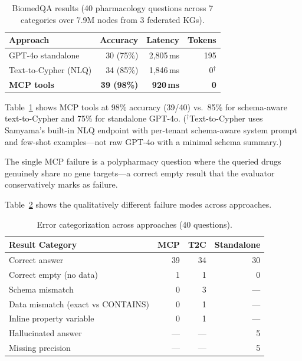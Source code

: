 \documentclass[sigconf]{acmart}
\begin{document}
\begin{table}[t]
\centering
\caption{BiomedQA results (40 pharmacology questions across
  7 categories over 7.9M nodes from 3 federated KGs).}
\label{tab:biomedqa}
\small
\begin{tabular}{@{}lrrr@{}}
\toprule
\textbf{Approach} & \textbf{Accuracy} & \textbf{Latency} & \textbf{Tokens} \\
\midrule
GPT-4o standalone & 30 (75\%) & 2,805\,ms & 195 \\
Text-to-Cypher (NLQ) & 34 (85\%) & 1,846\,ms & 0$^{\dagger}$ \\
\textbf{MCP tools}& \textbf{39 (98\%)} & \textbf{920\,ms} & \textbf{0} \\
\bottomrule
\end{tabular}
\end{table}

Table~\ref{tab:biomedqa} shows MCP tools at 98\% accuracy
(39/40) vs.\ 85\% for schema-aware text-to-Cypher and 75\%
for standalone GPT-4o.  ($^{\dagger}$Text-to-Cypher uses
Samyama's built-in NLQ endpoint with per-tenant schema-aware
system prompt and few-shot examples---not raw GPT-4o with a
minimal schema summary.)

The single MCP failure is a polypharmacy question where the
queried drugs genuinely share no gene targets---a correct
empty result that the evaluator conservatively marks as failure.

Table~\ref{tab:error_cats} shows the qualitatively different
failure modes across approaches.

\begin{table}[t]
\centering
\caption{Error categorization across approaches (40 questions).}
\label{tab:error_cats}
\small
\begin{tabular}{@{}lrrr@{}}
\toprule
\textbf{Result Category} & \textbf{MCP} & \textbf{T2C} & \textbf{Standalone} \\
\midrule
Correct answer           & 39 & 34 & 30 \\
Correct empty (no data)  &  1 &  1 &  0 \\
Schema mismatch          &  0 &  3 & --- \\
Data mismatch (exact vs CONTAINS) & 0 & 1 & --- \\
Inline property variable &  0 &  1 & --- \\
Hallucinated answer      & --- & --- &  5 \\
Missing precision        & --- & --- &  5 \\
\bottomrule
\end{tabular}
\end{table}
\end{document}
